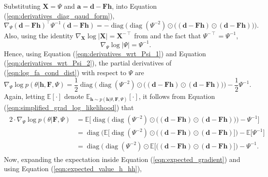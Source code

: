 \documentclass[msc,deptreport.inf]{infthesis} %
\newcommand{\matr}[1]{\mathbf{#1}}
\newcommand{\E}{\mathbb E}
\newcommand{\diag}{\mathop{\mathrm{diag}}}
\begin{document}
Substituting $\matr{X} = \Psi$ and $\matr{a} = \matr{d}- \matr{Fh}$, into Equation (\ref{eqn:derivatives_diag_qaud_form}),
\begin{equation}\label{eqn:derivatives_wrt_Psi_1}
	\nabla_\Psi (\matr{d} - \matr{Fh})^\intercal \Psi^{-1} (\matr{d}- \matr{Fh}) 
	= -\diag\Big(\diag(\Psi^{-2}) \odot \big((\matr{d} - \matr{Fh}) \odot (\matr{d} - \matr{Fh})\big)\Big).
\end{equation}
Also, using the identity $\nabla_\matr{X} \log |\matr{X}| = \matr{X}^{-\intercal}$ from \cite{petersen2012} and the fact that $\Psi^{-\intercal} = \Psi^{-1}$, 
\begin{equation}\label{eqn:derivatives_wrt_Psi_2}
	\nabla_\Psi \log |\Psi|
	= \Psi^{-1}.
\end{equation}
Hence, using Equation (\ref{eqn:derivatives_wrt_Psi_1}) and Equation (\ref{eqn:derivatives_wrt_Psi_2}), the partial derivatives of (\ref{eqn:log_fa_cond_dist}) with respect to $\Psi$ are
\begin{equation}
	\nabla_{\Psi} \log p(\theta | \matr{h}, \matr{F}, \Psi)
	= \frac{1}{2} \diag\Big(\diag(\Psi^{-2}) \odot \big((\matr{d} - \matr{Fh}) \odot (\matr{d} - \matr{Fh})\big)\Big) - \frac{1}{2}\Psi^{-1}.
\end{equation}
Again, letting $\E[\cdot]$ denote $\E_{\matr{h} \sim p(\matr{h} | \theta, \matr{F}, \Psi)}[\cdot]$, it follows from Equation (\ref{eqn:simplified_grad_log_likelihood}) that
\begin{align}\label{eqn:expected_gradient}
\begin{split}
	2 \cdot \nabla_{\Psi} \log p(\theta | \matr{F}, \Psi) 
	& = \E \Big[ \diag\Big(\diag(\Psi^{-2}) \odot \big((\matr{d} - \matr{Fh}) \odot (\matr{d} - \matr{Fh})\big)\Big) - \Psi^{-1} \Big] \\
	& = \diag\Big(\E \big[\diag(\Psi^{-2}) \odot \big((\matr{d} - \matr{Fh}) \odot (\matr{d} - \matr{Fh})\big]\Big) - \E \big[ \Psi^{-1} \big] \\
	& = \diag\Big(\diag(\Psi^{-2}) \odot \E \big[\big((\matr{d} - \matr{Fh}) \odot (\matr{d} - \matr{Fh})\big]\Big) - \Psi^{-1}.
\end{split}
\end{align} 
Now, expanding the expectation inside Equation (\ref{eqn:expected_gradient}) and using Equation (\ref{eqn:expected_value_h_hh}),
\end{document}
